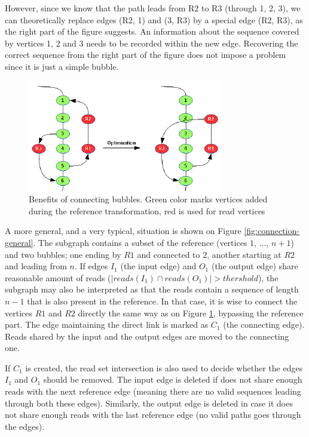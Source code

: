 However, since we know that the path leads from R2 to R3 (through 1, 2, 3), we can theoretically replace edges (R2, 1) and (3, R3) by a special edge (R2, R3), as the right part of the figure suggests. An information about the sequence covered by vertices 1, 2 and 3 needs to be recorded within the new edge. Recovering the correct sequence from the right part of the figure does not impose a problem since it is just a simple bubble. 

\begin{figure}
	\centering
	\includegraphics{img/bubble-connection.pdf}
	\caption{Benefits of connecting bubbles. Green color marks vertices added during the reference transformation, red is used for read vertices}
	\label{fig:bubble-connection}
\end{figure}

A more general, and a very typical, situation is shown on Figure \ref{fig:connection-general}. The subgraph contains a subset of the reference (vertices $1$, $...$, $n+1$) and two bubbles; one ending by $R1$ and connected to $2$, another starting at $R2$ and leading from $n$. If edges $I_1$ (the input edge) and $O_1$ (the output edge) share reasonable amount of reads ($|reads(I_1) \cap reads(O_1)| > thershold$), the subgraph may also be interpreted as that the reads contain a sequence of length $n-1$ that is also present in the reference. In that case, it is wise to connect the vertices $R1$ and $R2$ directly the same way as on Figure \ref{fig:bubble-connection}, bypassing the reference part. The edge maintaining the direct link is marked as $C_1$ (the connecting edge). Reads shared by the input and the output edges are moved to the connecting one.

If $C_1$ is created, the read set intersection is also used to decide whether the edges $I_1$ and $O_1$ should be removed. The input edge is deleted if does not share enough reads with the next reference edge (meaning there are no valid sequences leading through both these edges). Similarly, the output edge is deleted in case it does not share enough reads with the last reference edge (no valid paths goes through the edges).

